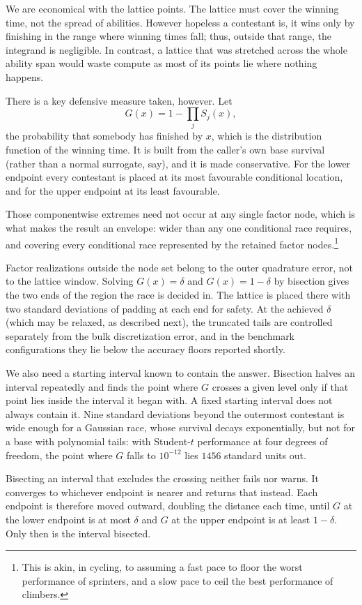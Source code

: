 \documentclass[11pt]{article}
\begin{document}
We are economical with the lattice points. The lattice must cover the winning time, not the spread of abilities. However
hopeless a contestant is, it wins only by finishing in the range where
winning times fall; thus, outside that range, the integrand is negligible. In contrast, a lattice that was stretched across the whole ability span would waste compute as most of its points lie where nothing happens.

There is a key defensive measure taken, however. Let $$G(x)=1-\prod_j S_j(x),$$ the probability that somebody has finished
by $x$, which is the distribution function of the winning time. It is
built from the caller's own base survival (rather than a normal
surrogate, say), and it is made conservative. For
the lower endpoint every contestant is placed at its most favourable conditional location, and for the upper endpoint at its least favourable.

Those componentwise extremes need not occur at any single factor node, which is what makes the result an envelope: wider than any one conditional race requires, and covering every conditional race represented by the retained factor nodes.\footnote{This is akin, in cycling, to assuming a fast pace to floor the worst performance of sprinters, and a slow pace to ceil the best performance of climbers.}

Factor realizations outside the node set belong to the outer quadrature error, not to the lattice
window. Solving $G(x)=\delta$ and
$G(x)=1-\delta$ by bisection gives the two ends of the region the race
is decided in. The lattice is placed there with two standard deviations of padding at
each end for safety. At the achieved $\delta$ (which may be relaxed, as
described next), the truncated tails are controlled separately from the
bulk discretization error, and in the benchmark configurations they lie
below the accuracy floors reported shortly.

We also need a starting interval known to contain the answer. Bisection
halves an interval repeatedly and finds the point where $G$ crosses a
given level only if that point lies inside the interval it began with. A
fixed starting interval does not always contain it. Nine standard
deviations beyond the outermost contestant is wide enough for a Gaussian
race, whose survival decays exponentially, but not for a base with
polynomial tails: with Student-$t$ performance at four degrees of
freedom, the point where $G$ falls to $10^{-12}$ lies $1456$ standard
units out.

Bisecting an interval that excludes the crossing neither fails nor warns.
It converges to whichever endpoint is nearer and returns that instead.
Each endpoint is therefore moved outward, doubling the distance each
time, until $G$ at the lower endpoint is at most $\delta$ and $G$ at the
upper endpoint is at least $1-\delta$. Only then is the interval
bisected.
\end{document}
